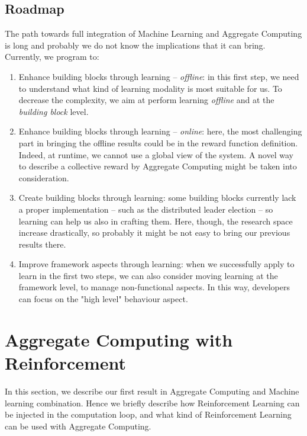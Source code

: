 \documentclass[conference]{IEEEtran}
\begin{document}
\subsection{Roadmap}
The path towards full integration of Machine Learning and Aggregate Computing is long and probably we do not know the implications that it can bring. 
Currently, we program to:
\begin{enumerate}
  \item Enhance building blocks through learning -- \textit{offline}: 
  in this first step, we need to understand what kind of learning modality is most suitable for us. 
  To decrease the complexity, we aim at perform learning \textit{offline} and at the \textit{building block} level.
  \item Enhance building blocks through learning -- \textit{online}:
  here, the most challenging part in bringing the offline results could be in the reward function definition.
  Indeed, at runtime, we cannot use a global view of the system. 
  A novel way to describe a collective reward by Aggregate Computing might be taken into consideration.
  \item Create building blocks through learning: some building blocks currently lack a proper implementation -- 
  such as the distributed leader election -- so learning can help us also in crafting them. 
  Here, though, the research space increase drastically, 
  so probably it might be not easy to bring our previous results there.
  \item Improve framework aspects through learning: 
  when we successfully apply to learn in the first two steps, 
  we can also consider moving learning at the framework level, to manage non-functional aspects. 
  In this way, developers can focus on the "high level" behaviour aspect.
\end{enumerate}

\section{Aggregate Computing with Reinforcement}
In this section, we describe our first result in Aggregate Computing and Machine learning combination.
% 
Hence we briefly describe how Reinforcement Learning can be injected in the computation loop,
 and what kind of Reinforcement Learning can be used with Aggregate Computing.
\end{document}
